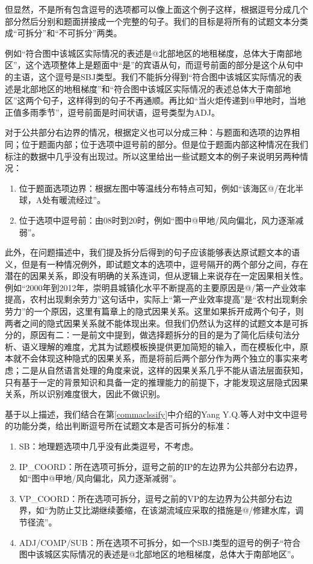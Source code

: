 \documentclass[master, winfont]{njuthesis}
\begin{document}
但显然，不是所有包含逗号的选项都可以像上面这个例子这样，根据逗号分成几个部分然后分别和题面拼接成一个完整的句子。我们的目标是将所有的试题文本分类成“可拆分”和“不可拆分”两类。

例如“符合图中该城区实际情况的表述是@北部地区的地租梯度，总体大于南部地区”，这个选项整体上是题面中“是”的宾语从句，而逗号前面的部分是这个从句中的主语，这个逗号是SBJ类型。我们不能拆分得到“符合图中该城区实际情况的表述是北部地区的地租梯度”和“符合图中该城区实际情况的表述总体大于南部地区”这两个句子，这样得到的句子不再通顺。再比如“当火炬传递到@甲地时，当地正值多雨季节”，逗号前面是时间状语，逗号类型为ADJ。

对于公共部分右边界的情况，根据定义也可以分成三种：与题面和选项的边界相同；位于题面内部；位于选项中逗号前的部分。但是位于题面内部这种情况在我们标注的数据中几乎没有出现过。所以这里给出一些试题文本的例子来说明另两种情况：
\begin{enumerate}
  \item 位于题面选项边界：根据左图中等温线分布特点可知，例如“该海区@/在北半球，A处有暖流经过”。
  \item 位于选项中逗号前：由08时到20时，例如“图中@甲地/风向偏北，风力逐渐减弱”。
\end{enumerate}

此外，在问题描述中，我们提及拆分后得到的句子应该能够表达原试题文本的语义，但是有一种情况例外，即试题文本的选项中，逗号隔开的两个部分之间，存在潜在的因果关系，即没有明确的关系连词，但从逻辑上来说存在一定因果相关性。例如“2000年到2012年，崇明县城镇化水平不断提高的主要原因是@/第一产业效率提高，农村出现剩余劳力”这句话中，实际上“第一产业效率提高”是“农村出现剩余劳力”的一个原因，这里有篇章上的隐式因果关系\cite{liyancui2015}。这里如果拆开成两个句子，则两者之间的隐式因果关系就不能体现出来。但我们仍然认为这样的试题文本是可拆分的，原因有二：一是前文中提到，做选择题拆分的目的是为了简化后续句法分析、语义理解的难度，尤其为试题模板换提供更加简短的输入，而在模板化中，原本就不会体现这种隐式的因果关系，而是将前后两个部分作为两个独立的事实来考虑；二是从自然语言处理的角度来说，这样的因果关系几乎不能从语法层面获知，只有基于一定的背景知识和具备一定的推理能力的前提下，才能发现这层隐式因果关系，所以识别难度很大，因此不做识别。

基于以上描述，我们结合在第\ref{commaclssify}中介绍的Yang Y.Q.等人\cite{Yang2012Chinese}对中文中逗号的功能分类，给出判断逗号所在试题文本是否可拆分的标准：
\begin{enumerate}
  \item SB：地理题选项中几乎没有此类逗号，不考虑。
  \item IP\_COORD：所在选项可拆分，逗号之前的IP的左边界为公共部分右边界，如“图中@甲地/风向偏北，风力逐渐减弱”。
  \item VP\_COORD：所在选项可拆分，逗号之前的VP的左边界为公共部分右边界，如“为防止艾比湖继续萎缩，在该湖流域应采取的措施是@/修建水库，调节径流”。
  \item ADJ/COMP/SUB：所在选项不可拆分，如一个SBJ类型的逗号的例子“符合图中该城区实际情况的表述是@北部地区的地租梯度，总体大于南部地区”。
\end{enumerate}
\end{document}
